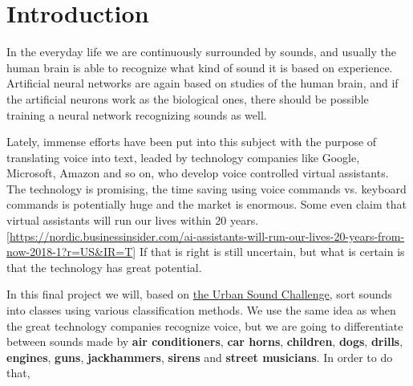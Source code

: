 \section{Introduction} \label{sec:introduction}
In the everyday life we are continuously surrounded by sounds, and usually the human brain is able to recognize what kind of sound it is based on experience. Artificial neural networks are again based on studies of the human brain, and if the artificial neurons work as the biological ones, there should be possible training a neural network recognizing sounds as well. 

Lately, immense efforts have been put into this subject with the purpose of translating voice into text, leaded by technology companies like Google, Microsoft, Amazon and so on, who develop voice controlled virtual assistants. The technology is promising, the time saving using voice commands vs. keyboard commands is potentially huge and the market is enormous. Some even claim that virtual assistants will run our lives within 20 years. [\url{https://nordic.businessinsider.com/ai-assistants-will-run-our-lives-20-years-from-now-2018-1?r=US&IR=T}] If that is right is still uncertain, but what is certain is that the technology has great potential.

In this final project we will, based on \href{https://datahack.analyticsvidhya.com/contest/practice-problem-urban-sound-classification/}{the Urban Sound Challenge}, sort sounds into classes using various classification methods. We use the same idea as when the great technology companies recognize voice, but we are going to differentiate between sounds made by \textbf{air conditioners}, \textbf{car horns}, \textbf{children}, \textbf{dogs}, \textbf{drills}, \textbf{engines}, \textbf{guns}, \textbf{jackhammers}, \textbf{sirens} and \textbf{street musicians}. In order to do that, 


